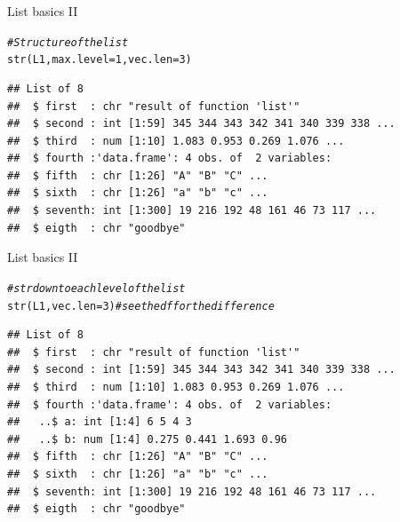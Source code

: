 \documentclass[xcolor=table,       handout,    xcolor=dvipsnames]{beamer}\usepackage[]{graphicx}\usepackage[]{color}
\makeatletter
\newcommand{\hlnum}[1]{\textcolor[rgb]{0,0,0}{#1}}
\newcommand{\hlcom}[1]{\textcolor[rgb]{0,0.392,0}{\textit{#1}}}
\newcommand{\hlstd}[1]{\textcolor[rgb]{0,0,0}{#1}}
\newcommand{\hlkwc}[1]{\textcolor[rgb]{1,0,1}{#1}}
\newcommand{\hlkwd}[1]{\textcolor[rgb]{0,0,1}{#1}}
\newenvironment{kframe}{%
 \def\at@end@of@kframe{}%
 \ifinner\ifhmode%
  \def\at@end@of@kframe{\end{minipage}}%
  \begin{minipage}{\columnwidth}%
 \fi\fi%
 \def\FrameCommand##1{\hskip\@totalleftmargin \hskip-\fboxsep
 \colorbox{shadecolor}{##1}\hskip-\fboxsep
     \hskip-\linewidth \hskip-\@totalleftmargin \hskip\columnwidth}%
 \MakeFramed {\advance\hsize-\width
   \@totalleftmargin\z@ \linewidth\hsize
   \@setminipage}}%
 {\par\unskip\endMakeFramed%
 \at@end@of@kframe}
\newenvironment{knitrout}{}{} %
\makeatother
\begin{document}
\begin{frame}[fragile]{List basics II}
\begin{knitrout}\small
{}\color{fgcolor}\begin{kframe}
\begin{alltt}
\hlcom{# Structure of the list}
\hlkwd{str}\hlstd{(L1,} \hlkwc{max.level}\hlstd{=}\hlnum{1}\hlstd{,} \hlkwc{vec.len}\hlstd{=}\hlnum{3}\hlstd{)}
\end{alltt}
\begin{verbatim}
## List of 8
##  $ first  : chr "result of function 'list'"
##  $ second : int [1:59] 345 344 343 342 341 340 339 338 ...
##  $ third  : num [1:10] 1.083 0.953 0.269 1.076 ...
##  $ fourth :'data.frame':	4 obs. of  2 variables:
##  $ fifth  : chr [1:26] "A" "B" "C" ...
##  $ sixth  : chr [1:26] "a" "b" "c" ...
##  $ seventh: int [1:300] 19 216 192 48 161 46 73 117 ...
##  $ eigth  : chr "goodbye"
\end{verbatim}
\end{kframe}
\end{knitrout}
\end{frame}


\begin{frame}[fragile]{List basics II}
\vspace{1.45em}
\begin{knitrout}\small
{}\color{fgcolor}\begin{kframe}
\begin{alltt}
\hlcom{# str down to each level of the list}
\hlkwd{str}\hlstd{(L1,} \hlkwc{vec.len}\hlstd{=}\hlnum{3}\hlstd{)} \hlcom{# see the df for the difference}
\end{alltt}
\begin{verbatim}
## List of 8
##  $ first  : chr "result of function 'list'"
##  $ second : int [1:59] 345 344 343 342 341 340 339 338 ...
##  $ third  : num [1:10] 1.083 0.953 0.269 1.076 ...
##  $ fourth :'data.frame':	4 obs. of  2 variables:
##   ..$ a: int [1:4] 6 5 4 3
##   ..$ b: num [1:4] 0.275 0.441 1.693 0.96
##  $ fifth  : chr [1:26] "A" "B" "C" ...
##  $ sixth  : chr [1:26] "a" "b" "c" ...
##  $ seventh: int [1:300] 19 216 192 48 161 46 73 117 ...
##  $ eigth  : chr "goodbye"
\end{verbatim}
\end{kframe}
\end{knitrout}
\end{frame}
\end{document}
